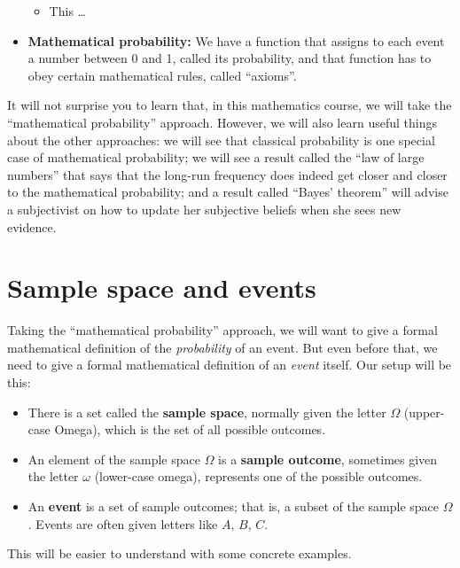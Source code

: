 \documentclass[
  a4paper,
]{book}
\providecommand{\tightlist}{%
  \setlength{\itemsep}{0pt}\setlength{\parskip}{0pt}}
\theoremstyle{definition}
\theoremstyle{definition}
\theoremstyle{definition}
\theoremstyle{remark}
\begin{document}
\begin{itemize}
  \begin{itemize}
  \tightlist
  \item
    This \ldots{}
  \end{itemize}
\item
  \textbf{Mathematical probability:} We have a function that assigns to each event a number between 0 and 1, called its probability, and that function has to obey certain mathematical rules, called ``axioms''.
\end{itemize}

It will not surprise you to learn that, in this mathematics course, we will take the ``mathematical probability'' approach. However, we will also learn useful things about the other approaches: we will see that classical probability is one special case of mathematical probability; we will see a result called the ``law of large numbers'' that says that the long-run frequency does indeed get closer and closer to the mathematical probability; and a result called ``Bayes' theorem'' will advise a subjectivist on how to update her subjective beliefs when she sees new evidence.

\hypertarget{sample-events}{%
\section{Sample space and events}\label{sample-events}}

Taking the ``mathematical probability'' approach, we will want to give a formal mathematical definition of the \emph{probability} of an event. But even before that, we need to give a formal mathematical definition of an \emph{event} itself. Our setup will be this:

\begin{itemize}
\tightlist
\item
  There is a set called the \textbf{sample space}, normally given the letter \(\Omega\) (upper-case Omega), which is the set of all possible outcomes.
\item
  An element of the sample space \(\Omega\) is a \textbf{sample outcome}, sometimes given the letter \(\omega\) (lower-case omega), represents one of the possible outcomes.
\item
  An \textbf{event} is a set of sample outcomes; that is, a subset of the sample space \(\Omega\). Events are often given letters like \(A\), \(B\), \(C\).
\end{itemize}

This will be easier to understand with some concrete examples.
\end{document}
